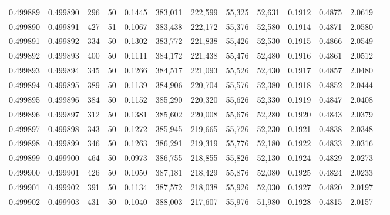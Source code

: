 \begin{tabular}{rrrrrrrrrrrrr}
0.499889 & 0.499890 & 296 &  50 &                                     0.1445 & 383,011 & 222,599 &  55,325 &  52,631 & 0.1912 & 0.4875 & 2.0619 \\
0.499890 & 0.499891 & 427 &  51 &                                     0.1067 & 383,438 & 222,172 &  55,376 &  52,580 & 0.1914 & 0.4871 & 2.0580 \\
0.499891 & 0.499892 & 334 &  50 &                                     0.1302 & 383,772 & 221,838 &  55,426 &  52,530 & 0.1915 & 0.4866 & 2.0549 \\
0.499892 & 0.499893 & 400 &  50 &                                     0.1111 & 384,172 & 221,438 &  55,476 &  52,480 & 0.1916 & 0.4861 & 2.0512 \\
0.499893 & 0.499894 & 345 &  50 &                                     0.1266 & 384,517 & 221,093 &  55,526 &  52,430 & 0.1917 & 0.4857 & 2.0480 \\
0.499894 & 0.499895 & 389 &  50 &                                     0.1139 & 384,906 & 220,704 &  55,576 &  52,380 & 0.1918 & 0.4852 & 2.0444 \\
0.499895 & 0.499896 & 384 &  50 &                                     0.1152 & 385,290 & 220,320 &  55,626 &  52,330 & 0.1919 & 0.4847 & 2.0408 \\
0.499896 & 0.499897 & 312 &  50 &                                     0.1381 & 385,602 & 220,008 &  55,676 &  52,280 & 0.1920 & 0.4843 & 2.0379 \\
0.499897 & 0.499898 & 343 &  50 &                                     0.1272 & 385,945 & 219,665 &  55,726 &  52,230 & 0.1921 & 0.4838 & 2.0348 \\
0.499898 & 0.499899 & 346 &  50 &                                     0.1263 & 386,291 & 219,319 &  55,776 &  52,180 & 0.1922 & 0.4833 & 2.0316 \\
0.499899 & 0.499900 & 464 &  50 &                                     0.0973 & 386,755 & 218,855 &  55,826 &  52,130 & 0.1924 & 0.4829 & 2.0273 \\
0.499900 & 0.499901 & 426 &  50 &                                     0.1050 & 387,181 & 218,429 &  55,876 &  52,080 & 0.1925 & 0.4824 & 2.0233 \\
0.499901 & 0.499902 & 391 &  50 &                                     0.1134 & 387,572 & 218,038 &  55,926 &  52,030 & 0.1927 & 0.4820 & 2.0197 \\
0.499902 & 0.499903 & 431 &  50 &                                     0.1040 & 388,003 & 217,607 &  55,976 &  51,980 & 0.1928 & 0.4815 & 2.0157 \\

\end{tabular}

